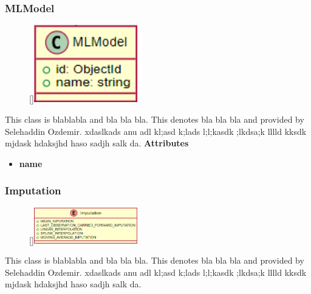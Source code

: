 \subsubsection{MLModel}
\label{MLModel}
\begin{figure}
    \raisebox{0pt}[\dimexpr{}\baselineskip\relax]{\includegraphics[width=4.5cm]{classes/model-management/4.png}}
\end{figure} 
\par
This class is blablabla and bla bla bla. This denotes bla bla bla and provided by Selehaddin Ozdemir. xdaslkads anu adl kl;asd k;lads l;l;kasdk ;lkdsa;k lllld kksdk mjdask hdaksjhd haso sadjh salk da.
\newline
\newline
\textbf{Attributes}
\begin{itemize}
    \item \textbf{name}
\end{itemize}

\subsubsection{Imputation}
\label{Imputation}
\begin{figure}
    \raisebox{0pt}[\dimexpr{}\baselineskip\relax]{\includegraphics[width=4.5cm]{classes/model-management/5.png}}
\end{figure} 
\par
This class is blablabla and bla bla bla. This denotes bla bla bla and provided by Selehaddin Ozdemir. xdaslkads anu adl kl;asd k;lads l;l;kasdk ;lkdsa;k lllld kksdk mjdask hdaksjhd haso sadjh salk da.
\newline
\newline

